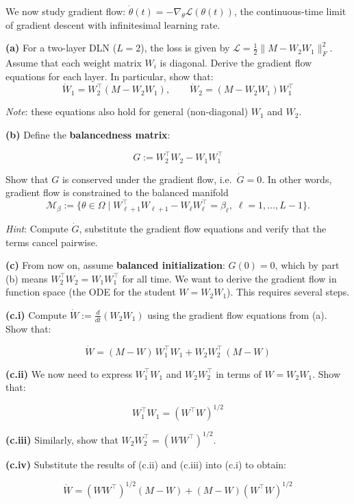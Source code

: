 \documentclass[
]{article}
\begin{document}
We now study gradient flow:
\(\dot{\theta}(t) = -\nabla_\theta \mathcal{L}(\theta(t))\), the
continuous-time limit of gradient descent with infinitesimal learning
rate.

\textbf{(a)} For a two-layer DLN (\(L=2\)), the loss is given by \(\mathcal{L} = \frac{1}{2}\|M - W_2 W_1\|_F^2\).
Assume that each weight matrix \(W_i\) is diagonal.
Derive the gradient flow equations for each layer.
In particular, show that:
\[\dot{W}_1 = W_2^\top(M - W_2 W_1), \qquad \dot{W}_2 = (M - W_2 W_1) W_1^\top\]

\emph{Note}: these equations also hold for general (non-diagonal)
\(W_1\) and \(W_2\).

\textbf{(b)} Define the \textbf{balancedness matrix}:

\[G := W_2^\top W_2 - W_1 W_1^\top\]

Show that \(G\) is conserved under the gradient flow,
i.e.~\(\dot{G} = 0\). In other words, gradient flow is constrained to the balanced manifold \begin{equation*}
    \mathcal{M}_{\beta}
    :=
    \{\theta\in\Omega\mid
    W_{\ell+1}^{\top}W_{\ell+1}
    -
    W_{\ell}W_{\ell}^{\top}
    =
    \beta_\ell,\;
    \ell=1,\ldots,L-1\}.
\end{equation*}

\emph{Hint}: Compute
\(\dot{G}\),
substitute the gradient flow equations and verify that the
terms cancel pairwise.

\textbf{(c)} From now on, assume \textbf{balanced initialization}:
\(G(0) = 0\), which by part (b) means \(W_2^\top W_2 = W_1 W_1^\top\)
for all time. We want to derive the gradient flow in function space (the
ODE for the student \(W = W_2 W_1\)). This requires several steps.

\textbf{(c.i)} Compute \(\dot{W} := \frac{d}{dt}(W_2 W_1)\) using the
gradient flow equations from (a). Show that:

\[\dot{W} = (M - W)\, W_1^\top W_1 + W_2 W_2^\top\, (M - W)\]

\textbf{(c.ii)} We now need to express \(W_1^\top W_1\) and
\(W_2 W_2^\top\) in terms of \(W = W_2 W_1\). Show that:

\[W_1^\top W_1 = (W^\top W)^{1/2}\]

\textbf{(c.iii)} Similarly, show that
\(W_2 W_2^\top = (W W^\top)^{1/2}\).

\textbf{(c.iv)} Substitute the results of (c.ii) and (c.iii) into (c.i)
to obtain:

\[\dot{W} = (W W^\top)^{1/2}(M - W) + (M - W)(W^\top W)^{1/2}\]
\end{document}
